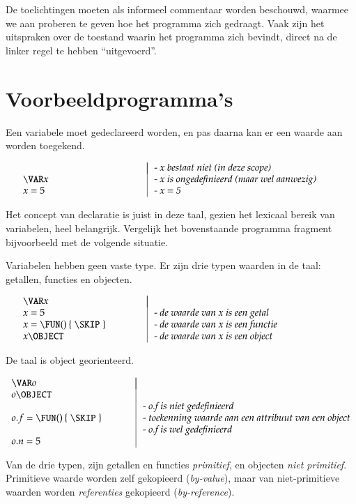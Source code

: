 \documentclass[11pt,oneside,parskip=half]{scrbook}
\makeatletter
\newcommand{\<}
  {\ensuremath{\langle}}
\renewcommand{\>}
  {\ensuremath{\rangle}}
\newenvironment{SyntaxExample}{%
\vspace{-1.6pc}%
	\begin{equation*}%
		\begin{array}{l@{\hspace*{.02\textwidth}}|@{\hspace*{.02\textwidth}}l}%
		\hspace*{.35\textwidth} & \hspace*{.55\textwidth} \\[-1pc]%
}{%
		\end{array}%
	\end{equation*}%
\vspace{-.6pc}%
}
\makeatother
\begin{document}
De toelichtingen moeten als informeel commentaar worden beschouwd, waarmee we aan proberen te geven hoe het programma zich gedraagt. Vaak zijn het uitspraken over de toestand waarin het programma zich bevindt, direct na de linker regel te hebben ``uitgevoerd''.

\section{Voorbeeldprogramma's}

Een variabele moet gedeclareerd worden, en pas daarna kan er een waarde aan worden toegekend.

	\begin{SyntaxExample}
		& \textit{- x bestaat niet (in deze scope)} \\
		\VAR x & \textit{- x is ongedefinieerd (maar wel aanwezig)} \\
		x = 5 & \textit{- x = 5}
	\end{SyntaxExample}

Het concept van declaratie is juist in deze taal, gezien het lexicaal bereik van variabelen, heel belangrijk. Vergelijk het bovenstaande programma fragment bijvoorbeeld met de volgende situatie.

Variabelen hebben geen vaste type. Er zijn drie typen waarden in de taal: getallen, functies en objecten.

	\begin{SyntaxExample}
		\VAR x \\
		x = 5 & \textit{- de waarde van } x \textit{ is een getal} \\
		x = \FUN()\,\{\;\SKIP\;\} & \textit{- de waarde van x is een functie} \\
		x \OBJECT & \textit{- de waarde van x is een object}
	\end{SyntaxExample}

De taal is object georienteerd.

	\begin{SyntaxExample}
		\VAR o \\
		o \OBJECT \\
		& \textit{- o.f is niet gedefinieerd} \\
		o.f = \FUN()\,\{\;\SKIP\;\} & \textit{- toekenning waarde aan een attribuut van een object} \\
		& \textit{- o.f is wel gedefinieerd} \\
		o.n = 5 &
	\end{SyntaxExample}

Van de drie typen, zijn getallen en functies \emph{primitief}, en objecten \emph{niet primitief}. Primitieve waarde worden zelf gekopieerd (\emph{by-value}), maar van niet-primitieve waarden worden \emph{referenties} gekopieerd (\emph{by-reference}).
\end{document}
